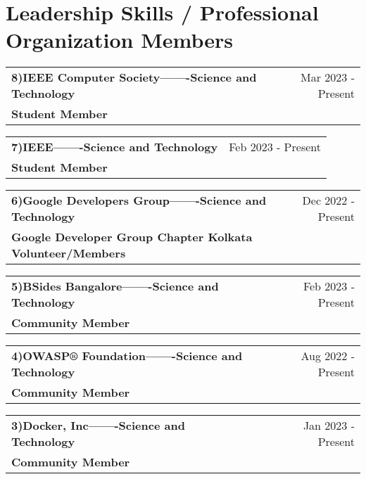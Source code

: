 \documentclass[a4paper,12pt]{article}
\begin{document}
\section{ Leadership Skills / Professional Organization Members
}


\begin{tabularx}{\linewidth}{ @{}l r@{} }
\textbf{8)IEEE Computer Society-------Science and Technology } &\hfill Mar 2023 - Present \\[3.75pt]

\textbf{Student Member}  
\end{tabularx}

\begin{tabularx}{\linewidth}{ @{}l r@{} }
\textbf{7)IEEE-------Science and Technology }&\hfill Feb 2023 - Present\\[3.75pt]

\textbf{Student Member} 
\end{tabularx}


\begin{tabularx}{\linewidth}{ @{}l r@{} }
\textbf{6)Google Developers Group-------Science and Technology }&\hfill Dec 2022 - Present \\[3.75pt]

\textbf{Google Developer Group Chapter Kolkata Volunteer/Members} 
\end{tabularx}



\begin{tabularx}{\linewidth}{ @{}l r@{} }
\textbf{5)BSides Bangalore-------Science and Technology } &\hfill Feb 2023 - Present \\[3.75pt]

\textbf{Community Member}  
\end{tabularx}


\begin{tabularx}{\linewidth}{ @{}l r@{} }
\textbf{4)OWASP® Foundation-------Science and Technology } &\hfill Aug 2022 - Present \\[3.75pt]

\textbf{Community Member}  
\end{tabularx}




\begin{tabularx}{\linewidth}{ @{}l r@{} }
\textbf{3)Docker, Inc-------Science and Technology } &\hfill Jan 2023 - Present \\[3.75pt]

\textbf{Community Member}  
\end{tabularx}
\end{document}
